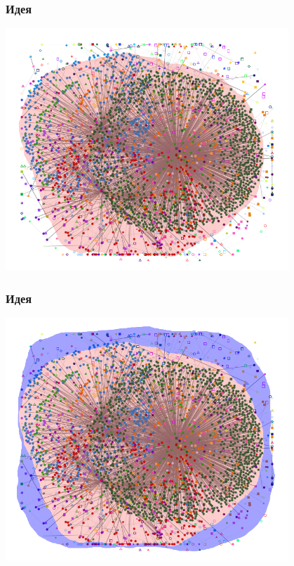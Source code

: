 \documentclass[10pt, compress]{beamer}
\begin{document}
\begin{frame}[fragile]
  \frametitle{Идея}
    {\vspace{-2em}\begin{center}\includegraphics[width=0.8\textwidth,height=0.8\textheight]{images/floyd_social_3.png}\end{center}}

\end{frame}

\begin{frame}[fragile]
  \frametitle{Идея}
    {\vspace{-2em}\begin{center}\includegraphics[width=0.8\textwidth,height=0.8\textheight]{images/floyd_social_4.png}\end{center}}

\end{frame}
\end{document}
